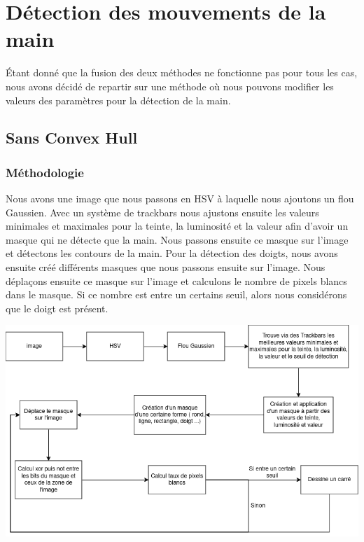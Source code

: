 \documentclass[11pt]{article}
\begin{document}
\newpage

\section{Détection des mouvements de la main}
\'Etant donné que la fusion des deux méthodes ne fonctionne pas pour tous les cas, nous avons décidé de repartir sur une méthode où nous pouvons modifier les valeurs des paramètres pour la détection de la main.

\subsection{Sans Convex Hull}

\subsubsection{Méthodologie}
Nous avons une image que nous passons en HSV à laquelle nous ajoutons un flou Gaussien. Avec un système de trackbars nous ajustons ensuite les valeurs minimales et maximales pour la teinte, la luminosité et la valeur afin d'avoir un masque qui ne détecte que la main. Nous passons ensuite ce masque sur l'image et détectons les contours de la main. Pour la détection des doigts, nous avons ensuite créé différents masques que nous passons ensuite sur l'image. Nous déplaçons ensuite ce masque sur l'image et calculons le nombre de pixels blancs dans le masque. Si ce nombre est entre un certains seuil, alors nous considérons que le doigt est présent. \bigbreak

\begin{center}
    \includegraphics[width=\textwidth]{images/pipeline_detect_fingers_sans_convex_hull.png}
    \label{fig:pipeline_detect_fingers_sans_convex_hull}
\end{center}
\end{document}
